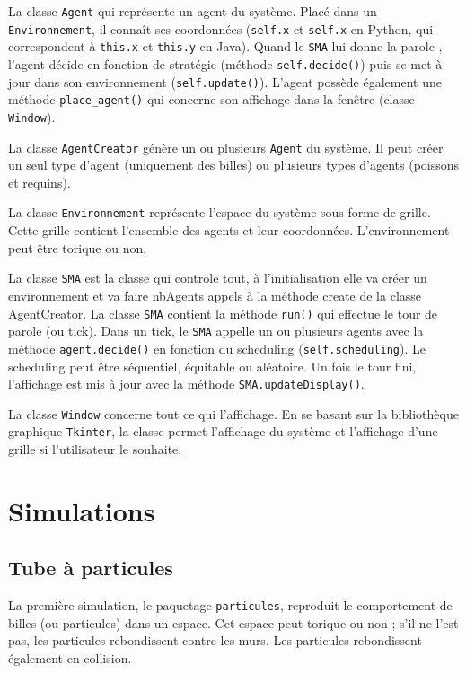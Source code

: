 \documentclass[a4paper]{article}
\begin{document}
\medskip
La classe \texttt{Agent} qui représente un agent du système. Placé dans un \texttt{Environnement}, il connaît ses coordonnées (\texttt{self.x} et \texttt{self.x} en Python, qui correspondent à \texttt{this.x} et \texttt{this.y} en Java). Quand le \texttt{SMA} lui \og donne la parole \fg{}, l'agent décide en fonction de stratégie (méthode \texttt{self.decide()}) puis se met à jour dans son environnement (\texttt{self.update()}). L'agent possède également une méthode \texttt{place\_agent()} qui concerne son affichage dans la fenêtre (classe \texttt{Window}).

\medskip
La classe \texttt{AgentCreator} génère un ou plusieurs \texttt{Agent} du système. Il peut créer un seul type d'agent (uniquement des billes) ou plusieurs types d'agents (poissons et requins).

\medskip
La classe \texttt{Environnement} représente l'espace du système sous forme de grille. Cette grille contient l'ensemble des agents et leur coordonnées. L'environnement peut être torique ou non. 

\medskip
La classe \texttt{SMA} est la classe qui controle tout, à l'initialisation elle va créer un environnement et va faire nbAgents appels à la méthode create de la classe AgentCreator.
La classe \texttt{SMA} contient la méthode \texttt{run()} qui effectue le tour de parole (ou tick). Dans un tick, le \texttt{SMA} appelle un ou plusieurs agents avec la méthode \texttt{agent.decide()} en fonction du scheduling (\texttt{self.scheduling}). Le scheduling peut être séquentiel, équitable ou aléatoire. Un fois le tour fini, l'affichage est mis à jour avec la méthode \texttt{SMA.updateDisplay()}.

\medskip
La classe \texttt{Window} concerne tout ce qui l'affichage. En se basant sur la bibliothèque graphique \texttt{Tkinter}, la classe permet l'affichage du système et l'affichage d'une grille si l'utilisateur le souhaite.

\section{Simulations}

\subsection{Tube à particules}

La première simulation, le paquetage \texttt{particules}, reproduit le comportement de billes (ou particules) dans un espace. Cet espace peut torique ou non ; s'il ne l'est pas, les particules rebondissent contre les murs. Les particules rebondissent également en collision.
\end{document}
